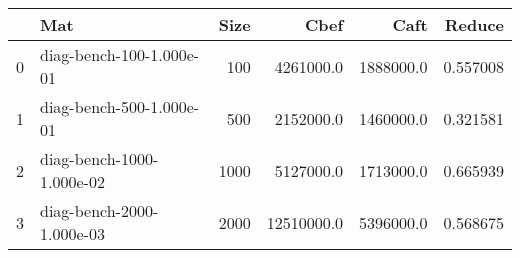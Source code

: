 \begin{tabular}{llrrrr}
\toprule
{} &                        Mat &  Size &        Cbef &       Caft &    Reduce \\
\midrule
0 &   diag-bench-100-1.000e-01 &   100 &   4261000.0 &  1888000.0 &  0.557008 \\
1 &   diag-bench-500-1.000e-01 &   500 &   2152000.0 &  1460000.0 &  0.321581 \\
2 &  diag-bench-1000-1.000e-02 &  1000 &   5127000.0 &  1713000.0 &  0.665939 \\
3 &  diag-bench-2000-1.000e-03 &  2000 &  12510000.0 &  5396000.0 &  0.568675 \\
\bottomrule
\end{tabular}
